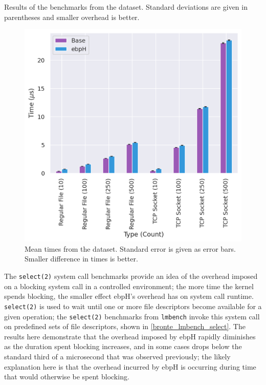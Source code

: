 \documentclass[
  12pt]{findlay}
\newcommand{\passthrough}[1]{#1}
\begin{document}
\FloatBarrier

\begin{table}
    \caption[Results of the  benchmarks from the  dataset]{
        Results of the  benchmarks from the  dataset.
        Standard deviations are given in parentheses and smaller overhead is better.
    }
    \label{bronte_lmbench_select}
    
\end{table}

\begin{figure}
    \caption[Mean  times from the  dataset]{
        Mean  times from the  dataset.
        Standard error is given as error bars.
        Smaller difference in times is better.
    }
    \label{bronte_lmbench_select_graph}
    \includegraphics[width=.8\textwidth]{../data/bench/bronte-lmbench/select_times.png}
\end{figure}

The \passthrough{\lstinline!select(2)!} system call benchmarks provide
an idea of the overhead imposed on a blocking system call in a
controlled environment; the more time the kernel spends blocking, the
smaller effect ebpH's overhead has on system call runtime.
\passthrough{\lstinline!select(2)!} \autocite{man_select} is used to
wait until one or more file descriptors become available for a given
operation; the \passthrough{\lstinline!select(2)!} benchmarks from
\passthrough{\lstinline!lmbench!} invoke this system call on predefined
sets of file descriptors, shown in \autoref{bronte_lmbench_select}. The
results here demonstrate that the overhead imposed by ebpH rapidly
diminishes as the duration spent blocking increases, and in some cases
drops below the standard third of a microsecond that was observed
previously; the likely explanation here is that the overhead incurred by
ebpH is occurring during time that would otherwise be spent blocking.
\end{document}
